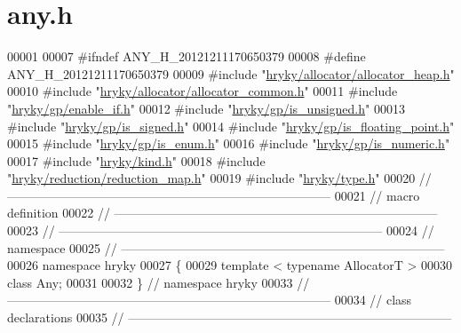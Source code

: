 \hypertarget{any_8h_source}{\section{any.\-h}
}

\begin{DoxyCode}
00001 
00007 \textcolor{preprocessor}{#ifndef ANY\_H\_20121211170650379}
00008 \textcolor{preprocessor}{}\textcolor{preprocessor}{#define ANY\_H\_20121211170650379}
00009 \textcolor{preprocessor}{}\textcolor{preprocessor}{#include "\hyperlink{allocator__heap_8h}{hryky/allocator/allocator_heap.h}"}
00010 \textcolor{preprocessor}{#include "\hyperlink{allocator__common_8h}{hryky/allocator/allocator_common.h}"}
00011 \textcolor{preprocessor}{#include "\hyperlink{enable__if_8h}{hryky/gp/enable_if.h}"}
00012 \textcolor{preprocessor}{#include "\hyperlink{is__unsigned_8h}{hryky/gp/is_unsigned.h}"}
00013 \textcolor{preprocessor}{#include "\hyperlink{is__signed_8h}{hryky/gp/is_signed.h}"}
00014 \textcolor{preprocessor}{#include "\hyperlink{is__floating__point_8h}{hryky/gp/is_floating_point.h}"}
00015 \textcolor{preprocessor}{#include "\hyperlink{is__enum_8h}{hryky/gp/is_enum.h}"}
00016 \textcolor{preprocessor}{#include "\hyperlink{is__numeric_8h}{hryky/gp/is_numeric.h}"}
00017 \textcolor{preprocessor}{#include "\hyperlink{kind_8h}{hryky/kind.h}"}
00018 \textcolor{preprocessor}{#include "\hyperlink{reduction__map_8h}{hryky/reduction/reduction_map.h}"}
00019 \textcolor{preprocessor}{#include "\hyperlink{type_8h}{hryky/type.h}"}
00020 \textcolor{comment}{//
      ------------------------------------------------------------------------------}
00021 \textcolor{comment}{// macro definition}
00022 \textcolor{comment}{//
      ------------------------------------------------------------------------------}
00023 \textcolor{comment}{//
      ------------------------------------------------------------------------------}
00024 \textcolor{comment}{// namespace}
00025 \textcolor{comment}{//
      ------------------------------------------------------------------------------}
00026 \textcolor{keyword}{namespace }hryky
00027 \{
00029     \textcolor{keyword}{template} < \textcolor{keyword}{typename} AllocatorT >
00030     \textcolor{keyword}{class }Any;
00031 
00032 \} \textcolor{comment}{// namespace hryky}
00033 \textcolor{comment}{//
      ------------------------------------------------------------------------------}
00034 \textcolor{comment}{// class declarations}
00035 \textcolor{comment}{//
      ------------------------------------------------------------------------------}

\end{DoxyCode}
